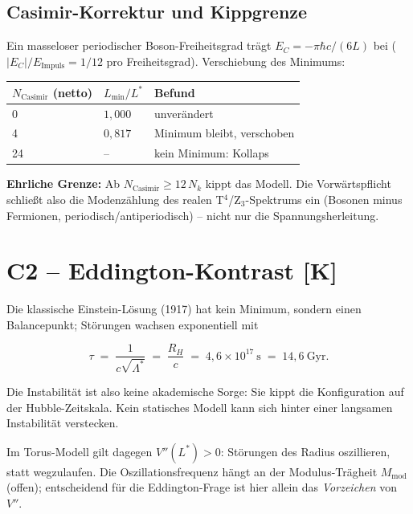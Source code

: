 \documentclass[11pt]{report}
\begin{document}
\subsection{Casimir-Korrektur und Kippgrenze}

Ein masseloser periodischer Boson-Freiheitsgrad trägt
$E_C = -\pi\hbar c/(6L)$ bei ($|E_C|/E_\text{Impuls} = 1/12$ pro
Freiheitsgrad). Verschiebung des Minimums:

\begin{center}
\begin{tabular}{lll}
\toprule
$N_\text{Casimir}$ (netto) & $L_{\min}/L^{*}$ & Befund \\
\midrule
0  & $1{,}000$ & unverändert \\
4  & $0{,}817$ & Minimum bleibt, verschoben \\
24 & --        & kein Minimum: Kollaps \\
\bottomrule
\end{tabular}
\end{center}

\textbf{Ehrliche Grenze:} Ab $N_\text{Casimir} \ge 12\,N_k$ kippt
das Modell. Die Vorwärtspflicht schließt also die Modenzählung des
realen T$^4$/Z$_3$-Spektrums ein (Bosonen minus Fermionen,
periodisch/antiperiodisch) -- nicht nur die Spannungsherleitung.

\section{C2 -- Eddington-Kontrast [K]}

Die klassische Einstein-Lösung (1917) hat kein Minimum, sondern
einen Balancepunkt; Störungen wachsen exponentiell mit

\begin{equation}
  \tau \;=\; \frac{1}{c\sqrt{\Lambda^{*}}} \;=\; \frac{R_H}{c}
  \;=\; 4{,}6\times10^{17}~\text{s} \;=\; 14{,}6~\text{Gyr}.
\end{equation}

Die Instabilität ist also keine akademische Sorge: Sie kippt die
Konfiguration auf der Hubble-Zeitskala. Kein statisches Modell kann
sich hinter einer langsamen Instabilität verstecken.

Im Torus-Modell gilt dagegen $V''(L^{*}) > 0$: Störungen des Radius
oszillieren, statt wegzulaufen. Die Oszillationsfrequenz hängt an
der Modulus-Trägheit $M_\text{mod}$ (offen); entscheidend für die
Eddington-Frage ist hier allein das \emph{Vorzeichen} von $V''$.
\end{document}
